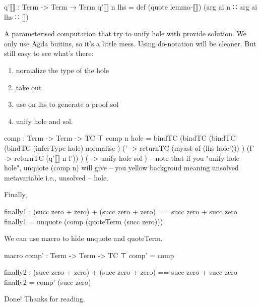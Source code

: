 \documentclass{article}
\begin{document}
\begin{code}
q'⟦⟧ : Term -> Term → Term
q'⟦⟧ n lhs = def (quote lemma-⟦⟧) (arg ai n ∷ arg ai lhs ∷ [])
\end{code}

A parameterised  computation that try to unify hole with provide solution. We only use Agda buitins, so it's a little mess. Using do-notation will be cleaner. But still easy to see what's there:

\begin{enumerate}
  \item normalize the type of the hole
  \item take out 
  \item use  on lhs to generate a proof sol
  \item unify hole and sol.
\end{enumerate}

\begin{code}
comp : Term -> Term -> TC ⊤
comp n hole =
  bindTC
    (bindTC
      (bindTC 
        (bindTC
          (inferType hole)
          normalise
        )
        (\hole' -> returnTC (myast-of (lhs hole')))
      )
      (\l' ->  returnTC (q'⟦⟧ n l'))
    )
    ( \sol -> unify hole sol )
  -- note that if you "unify hole hole", unquote (comp n) will give
  -- you yellow backgroud meaning unsolved metavariable i.e., unsolved
  -- hole.
\end{code}

Finally,

\begin{code}
finally1 : (succ zero + zero) + (succ zero + zero) == succ zero + succ zero
finally1 = unquote (comp (quoteTerm (succ zero)))
\end{code}

We can use macro to hide unquote and quoteTerm.

\begin{code}
macro
  comp' : Term -> Term -> TC ⊤
  comp' = comp

finally2 : (succ zero + zero) + (succ zero + zero) == succ zero + succ zero
finally2 = comp' (succ zero)
\end{code}

Done! Thanks for reading.
\end{document}
